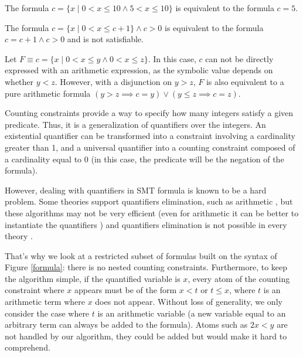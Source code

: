 \documentclass[]{article}
\begin{document}
\begin{example}
The formula $c = \{x \mid 0 < x \le 10 \land 5 < x \le 10\}$ is equivalent to the formula $c = 5$.
\end{example}

\begin{example} The formula $c = \{x \mid 0 < x \le c + 1\} \land c > 0$ is equivalent to the formula $c = c+1 \land c >0$ and is not satisfiable.
\end{example}

\begin{example} Let  $F \equiv c = \{x \mid 0 < x \le y \land 0 < x \le z\}$. In this case, $c$ can
not be directly expressed with an arithmetic expression, as the symbolic value depends on whether $y < z$. However, with a disjunction on $y >z$, $F$ is also equivalent to a pure arithmetic formula $(y > z \implies c = y) \lor (y \le z \implies c = z)$.
\end{example}

Counting constraints provide a way to specify how many integers satisfy
a given predicate. Thus, it is a generalization of quantifiers over the
integers. An existential
quantifier can be transformed into a constraint involving a cardinality
greater than 1, and a universal quantifier into a counting constraint
composed of a cardinality equal to 0 (in this case, the predicate will
be the negation of the formula).

However, dealing with quantifiers in SMT formula is known to be a hard problem. Some theories
support quantifiers elimination, such as arithmetic \cite{cooper}, but these algorithms may not be very
efficient (even for arithmetic it can be better to instantiate the quantifiers \cite{dutertre2015solving}) and quantifiers elimination is not possible in every theory \cite{bradley2006s}.

That's why we look at a restricted subset of formulas built on the syntax of Figure \ref{formula}:
there is no nested counting constraints. Furthermore, to keep the algorithm simple, if the
quantified variable is $x$, every atom of the counting constraint where $x$ appears must be of the form $x < t$ or $t \le x$,
where $t$ is an arithmetic term where $x$ does not appear. Without loss of generality, we only
consider the case where $t$  is an arithmetic variable (a new variable equal to an arbitrary term
can always be added to the formula). Atoms such as $2x < y$ are not handled by our algorithm, 
they could be added but would make it hard to comprehend.
\end{document}
